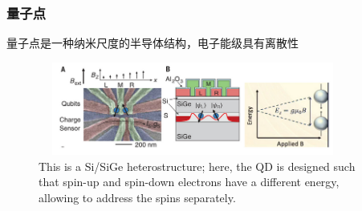 \begin{frame}
    \frametitle{量子点}
        量子点是一种纳米尺度的半导体结构，电子能级具有离散性\\
	{\fontsize{8.5pt}{5.2pt}\selectfont{通过控制量子点中的电子数量和能级结构，可以实现对量子态的精确调控}}
    \begin{figure}
        \centering
                \includegraphics[height=1.2in, width=4.0in, viewport=0 0 720 237,clip]{Figures/Si_SiGe-heterostructure_QD-spin_up-and-spin_down-electrons-have-a-different-energy.png}
		\caption{\tiny{\textrm{This is a Si/SiGe heterostructure; here, the QD is designed such that spin-up and spin-down electrons have a different energy, allowing to address the spins separately.}}}
		\label{Fig:Si_SiGe-heterostructure_QD-spin_up-and-spin_down-electrons-have-a-different-energy}
    \end{figure}
       	    \vskip -10pt
	    {\fontsize{7.5pt}{5.2pt}\selectfont{在半导体量子计算中，量子点可作为量子比特的载体，用于生成和处理量子信息}}
\end{frame}

